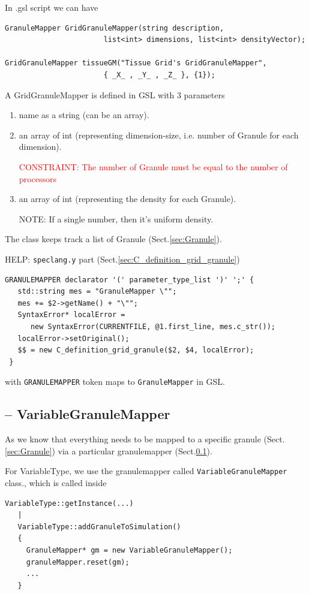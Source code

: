 In .gsl script we can have
\begin{verbatim}
GranuleMapper GridGranuleMapper(string description, 
                       list<int> dimensions, list<int> densityVector);

GridGranuleMapper tissueGM("Tissue Grid's GridGranuleMapper",
                       { _X_ , _Y_ , _Z_ }, {1});
\end{verbatim}

A GridGranuleMapper is defined in GSL with 3 parameters
\begin{enumerate}
  \item name as a string (can be an array).
  
  \item an array of int (representing dimension-size, i.e. number of Granule for
  each dimension).

\textcolor{red}{CONSTRAINT: The number of Granule must be equal to the number
of processors}
  
  \item an array of int (representing the density for each Granule).
  
  NOTE: If a single number, then it's uniform density.
\end{enumerate}
The class keeps track a list of Granule (Sect.\ref{sec:Granule}).

HELP: \verb!speclang.y! part (Sect.\ref{sec:C_definition_grid_granule})
\begin{verbatim}
GRANULEMAPPER declarator '(' parameter_type_list ')' ';' {
   std::string mes = "GranuleMapper \"";
   mes += $2->getName() + "\"";
   SyntaxError* localError = 
      new SyntaxError(CURRENTFILE, @1.first_line, mes.c_str());
   localError->setOriginal();
   $$ = new C_definition_grid_granule($2, $4, localError);
 }
\end{verbatim}
with \verb!GRANULEMAPPER! token maps to \verb!GranuleMapper! in GSL.




\subsection{-- VariableGranuleMapper}
\label{sec:VariableGranuleMapper}

As we know that everything needs to be mapped to a specific granule
(Sect.\ref{sec:Granule}) via a particular granulemapper
(Sect.\ref{sec:VariableGranuleMapper}).

For VariableType, we use the granulemapper called \verb!VariableGranuleMapper!
class., which is called inside
\begin{verbatim}
VariableType::getInstance(...)
   |
   VariableType::addGranuleToSimulation()
   {
     GranuleMapper* gm = new VariableGranuleMapper();
     granuleMapper.reset(gm);
     ...
   }
\end{verbatim}


